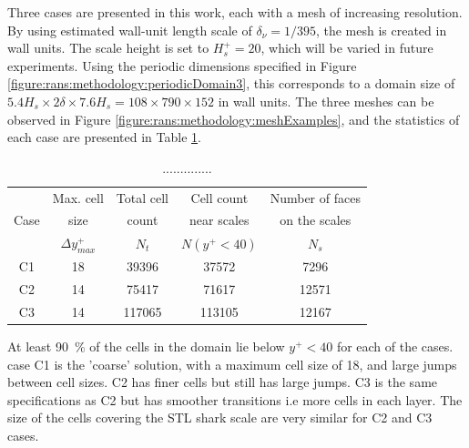 \documentclass[12pt,oneside,a4paper]{article}
\begin{document}
Three cases are presented in this work, each with a mesh of increasing resolution. By using estimated wall-unit length scale of $\delta_\nu = 1/395$, the mesh is created in wall units. The scale height is set to $H_s^+ = 20$, which will be varied in future experiments. Using the periodic dimensions specified in Figure \ref{figure:rans:methodology:periodicDomain3}, this corresponds to a domain size of $ 5.4 H_s \times 2\delta  \times  7.6 H_s =  108 \times 790 \times 152$ in wall units. The three meshes can be observed in Figure \ref{figure:rans:methodology:meshExamples}, and the statistics of each case are presented in Table \ref{table:rans:meshStats}.
%
\begin{table}
\centering
\caption{..............}
\label{table:rans:meshStats}
\begin{tabular}{c c c c c}
\hline
	&  Max. cell	&	Total cell	&	Cell count	&	Number of faces \\
Case	&  size	&  count	&  near scales	&  on the scales	\\
		&	$\Delta y^+_{max}$	&	$N_t$	&	$N(y^+<40)$	&	$N_s$\\
\hline
C1	&	18	&	39396	&	37572	&	7296	\\
C2	&	14	&	75417	&	71617	&	12571	\\
C3	&	14	&	117065	&	113105	&	12167	\\
\hline
\end{tabular}
\end{table}
%
 At least \SI{90}{\%} of the cells in the domain lie below $y^+ < 40$ for each of the cases. case C1 is the 'coarse' solution, with a maximum cell size of 18, and large jumps between cell sizes. C2 has finer cells but still has large jumps. C3 is the same specifications as C2 but has smoother transitions i.e more cells in each layer. The size of the cells covering the STL shark scale are very similar for C2 and C3 cases. 
 
\end{document}
